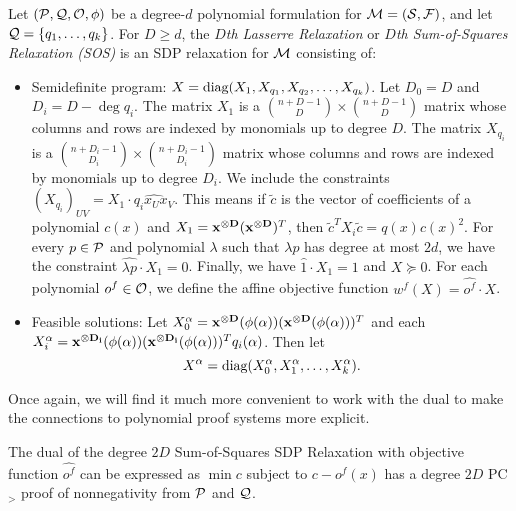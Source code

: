 \begin{definition}
Let $(\mathcal P, \mathcal Q, \mathcal O, \phi)$ be a degree-$d$ polynomial formulation for $\mathcal M = (\mathcal S, \mathcal F)$, and let $\mathcal Q = \{q_1, \dots, q_k\}$. For $D \geq d$, the \emph{$D$th Lasserre Relaxation} or \emph{$D$th Sum-of-Squares Relaxation (SOS)} is an SDP relaxation for $\mathcal M$ consisting of:
\begin{itemize}
\item Semidefinite program: $X = \text{diag}(X_1, X_{q_1}, X_{q_2}, \dots, X_{q_k})$. Let $D_0 = D$ and $D_i = D - \deg q_i$. The matrix $X_1$ is a $\binom{n+D-1}{D} \times \binom{n+D-1}{D}$ matrix whose columns and rows are indexed by monomials up to degree $D$. The matrix $X_{q_i}$ is a $\binom{n+D_i - 1}{D_i} \times \binom{n+D_i - 1}{D_i}$ matrix whose columns and rows are indexed by monomials up to degree $D_i$. We include the constraints $(X_{q_i})_{UV} = X_1 \cdot \widehat{q_ix_Ux_V}$. This means if $\tilde{c}$ is the vector of coefficients of a polynomial $c(x)$ and $X_1 = \mathbf{x^{\otimes D}}(\mathbf{x^{\otimes D}})^T$, then $\tilde{c}^TX_i\tilde{c} = q(x)c(x)^2$. For every $p \in \mathcal P$ and polynomial $\lambda$ such that $\lambda p$ has degree at most $2d$, we have the constraint $\widehat{\lambda p} \cdot X_1 = 0$. Finally, we have $\widehat{1} \cdot X_1 = 1$ and $X \succeq 0$. For each polynomial $o^f \in \mathcal O$, we define the affine objective function $w^f(X) = \widehat{o^f} \cdot X$.
\item Feasible solutions: Let $X_0^\alpha = \mathbf{x^{\otimes D}}(\phi(\alpha))(\mathbf{x^{\otimes D}}(\phi(\alpha)))^T$ and each \\ $X_i^\alpha = \mathbf{x^{\otimes D_i}}(\phi(\alpha))(\mathbf{x^{\otimes D_i}}(\phi(\alpha)))^Tq_i(\alpha)$. Then let
\[X^\alpha = \text{diag}(X_0^\alpha, X_1^\alpha,\dots,X_k^\alpha).\]
\end{itemize}
\end{definition}
Once again, we will find it much more convenient to work with the dual to make the connections to polynomial proof systems more explicit.
\begin{lemma}
The dual of the degree $2D$ Sum-of-Squares SDP Relaxation with objective function $\widehat{o^f}$ can be expressed as  $\min c$ subject to $c - o^f(x)$ has a degree $2D$ PC$_>$ proof of nonnegativity from $\mathcal P$ and $\mathcal Q$.
\end{lemma}
